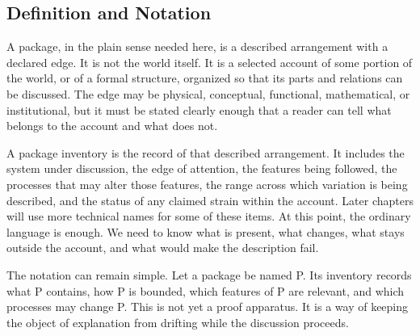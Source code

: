 \documentclass[11pt,a4paper,openany]{book}
\begin{document}
\subsection{Definition and Notation}
A package, in the plain sense needed here, is a described arrangement with a declared edge. It is not the world itself. It is a selected account of some portion of the world, or of a formal structure, organized so that its parts and relations can be discussed. The edge may be physical, conceptual, functional, mathematical, or institutional, but it must be stated clearly enough that a reader can tell what belongs to the account and what does not. \cite{goldenfeld_lectures,kadanoff_scaling}\par
A package inventory is the record of that described arrangement. It includes the system under discussion, the edge of attention, the features being followed, the processes that may alter those features, the range across which variation is being described, and the status of any claimed strain within the account. Later chapters will use more technical names for some of these items. At this point, the ordinary language is enough. We need to know what is present, what changes, what stays outside the account, and what would make the description fail.\par
The notation can remain simple. Let a package be named P. Its inventory records what P contains, how P is bounded, which features of P are relevant, and which processes may change P. This is not yet a proof apparatus. It is a way of keeping the object of explanation from drifting while the discussion proceeds.\par
\end{document}
